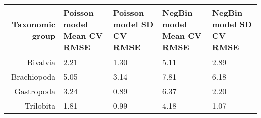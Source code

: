 \documentclass[12pt,letterpaper]{article}
\begin{document}
\begin{sidewaystable}
  \centering
  \caption{}
  \label{tab:test_rmse}
  \begin{tabular}{r|llll}
    \hline
    Taxonomic group & Poisson model Mean CV RMSE & Poisson model SD CV RMSE & NegBin model Mean CV RMSE & NegBin model SD CV RMSE \\ 
    \hline
    Bivalvia & 2.21 & 1.30 & 5.11 & 2.89 \\ 
    Brachiopoda & 5.05 & 3.14 & 7.81 & 6.18 \\ 
    Gastropoda & 3.24 & 0.89 & 6.37 & 2.20 \\ 
    Trilobita & 1.81 & 0.99 & 4.18 & 1.07 \\ 
    \hline
  \end{tabular}
\end{sidewaystable}
\end{document}
